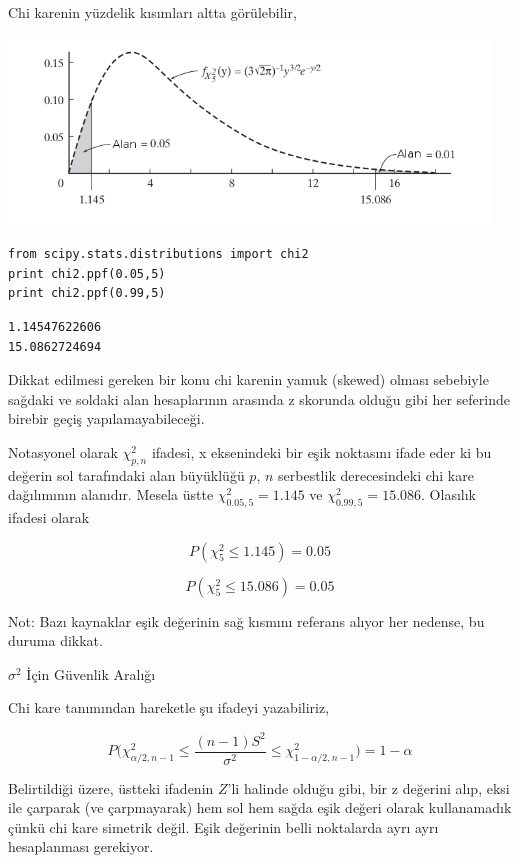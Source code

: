 \documentclass[12pt,fleqn]{article}\usepackage{../../common}
\begin{document}
Chi karenin yüzdelik kısımları altta görülebilir,

\includegraphics[height=5cm]{chi_1.png}

\begin{verbatim}
from scipy.stats.distributions import chi2
print chi2.ppf(0.05,5)
print chi2.ppf(0.99,5)
\end{verbatim}

\begin{verbatim}
1.14547622606
15.0862724694
\end{verbatim}

Dikkat edilmesi gereken bir konu chi karenin yamuk (skewed) olması
sebebiyle sağdaki ve soldaki alan hesaplarının arasında z skorunda olduğu
gibi her seferinde birebir geçiş yapılamayabileceği. 

Notasyonel olarak $\chi_{p,n}^2$ ifadesi, x eksenindeki bir eşik noktasını
ifade eder ki bu değerin sol tarafındaki alan büyüklüğü $p$, $n$ serbestlik
derecesindeki chi kare dağılımının alanıdır. Mesela üstte $\chi_{0.05,5}^2 =
1.145$ ve $\chi_{0.99,5}^2 = 15.086$. Olasılık ifadesi olarak 

$$ P(\chi_5^2 \le 1.145) = 0.05 $$

$$ P(\chi_5^2 \le 15.086) = 0.05 $$

Not: Bazı kaynaklar eşik değerinin sağ kısmını referans alıyor her
nedense, bu duruma dikkat.

$\sigma^2$ İçin Güvenlik Aralığı

Chi kare tanımından hareketle şu ifadeyi yazabiliriz, 

$$ P\bigg(
\chi_{\alpha/2,n-1}^2 \le
\frac{(n-1)S^2}{\sigma^2}  \le
\chi_{1-\alpha/2,n-1}^2
\bigg) = 1-\alpha
$$

Belirtildiği üzere, üstteki ifadenin $Z$'li halinde olduğu gibi, bir z
değerini alıp, eksi ile çarparak (ve çarpmayarak) hem sol hem sağda eşik
değeri olarak kullanamadık çünkü chi kare simetrik değil. Eşik değerinin
belli noktalarda ayrı ayrı hesaplanması gerekiyor.
\end{document}

